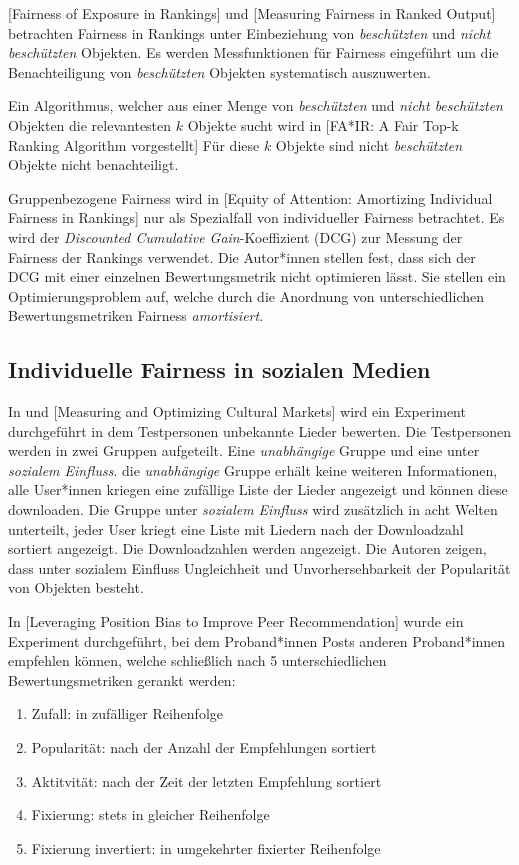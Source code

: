 [Fairness of Exposure in Rankings] und [Measuring Fairness in Ranked Output] betrachten Fairness in Rankings unter Einbeziehung von \textit{beschützten} und \textit{nicht beschützten} Objekten. Es werden Messfunktionen für Fairness eingeführt um die Benachteiligung von \textit{beschützten} Objekten systematisch auszuwerten.

Ein Algorithmus, welcher aus einer Menge von \textit{beschützten} und \textit{nicht beschützten} Objekten die relevantesten $k$ Objekte sucht wird in [FA*IR: A Fair Top-k Ranking Algorithm vorgestellt] Für diese $k$ Objekte sind nicht \textit{beschützten} Objekte nicht benachteiligt.

Gruppenbezogene Fairness wird in [Equity of Attention: Amortizing Individual Fairness in Rankings] nur als Spezialfall von individueller Fairness betrachtet. Es wird der \textit{Discounted Cumulative Gain}-Koeffizient (DCG) zur Messung der Fairness der Rankings verwendet. Die Autor*innen stellen fest, dass sich der DCG mit einer einzelnen Bewertungsmetrik nicht optimieren lässt. Sie stellen ein Optimierungsproblem auf, welche durch die Anordnung von unterschiedlichen Bewertungsmetriken Fairness \textit{amortisiert}.


\subsection{Individuelle Fairness in sozialen Medien}

In \cite{Salganik2006854} und [Measuring and Optimizing Cultural Markets] wird ein Experiment durchgeführt in dem Testpersonen unbekannte Lieder bewerten. Die Testpersonen werden in zwei Gruppen aufgeteilt. Eine \textit{unabhängige} Gruppe und eine unter \textit{sozialem Einfluss}. die \textit{unabhängige} Gruppe erhält keine weiteren Informationen, alle User*innen kriegen eine zufällige Liste der Lieder angezeigt und können diese downloaden. Die Gruppe unter \textit{sozialem Einfluss} wird zusätzlich in acht Welten unterteilt, jeder User kriegt eine Liste mit Liedern nach der Downloadzahl sortiert angezeigt. Die Downloadzahlen werden angezeigt. Die Autoren zeigen, dass unter sozialem Einfluss Ungleichheit und Unvorhersehbarkeit der Popularität von Objekten besteht.

In [Leveraging Position Bias to Improve Peer Recommendation] wurde ein Experiment durchgeführt, bei dem Proband*innen Posts anderen Proband*innen empfehlen können, welche schließlich nach 5 unterschiedlichen Bewertungsmetriken gerankt werden: 
\begin{enumerate}
	\item Zufall: in zufälliger Reihenfolge
	\item Popularität: nach der Anzahl der Empfehlungen sortiert
	\item Aktitvität: nach der Zeit der letzten Empfehlung sortiert
	\item Fixierung: stets in gleicher Reihenfolge
	\item Fixierung invertiert: in umgekehrter fixierter Reihenfolge
\end{enumerate}

